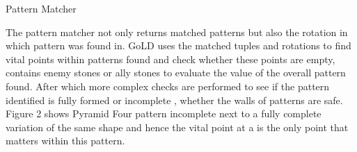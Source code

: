 \documentclass{l4proj}
\begin{document}
\begin{algorithm}[H]
\caption{Pattern Matcher}\label{Pattern Matcher}
    \DontPrintSemicolon
\end{algorithm}

The pattern matcher not only returns matched patterns but also the rotation in which pattern was found in. GoLD uses the matched tuples and rotations to find vital points within patterns found and check whether these points are empty, contains enemy stones or ally stones to evaluate the value of the overall pattern found. After which more complex checks are performed to see if the pattern identified is fully formed or incomplete , whether the walls of patterns are safe. Figure 2 shows Pyramid Four pattern incomplete next to a fully complete variation of the same shape and hence the vital point at a is the only point that matters within this pattern.
\end{document}
